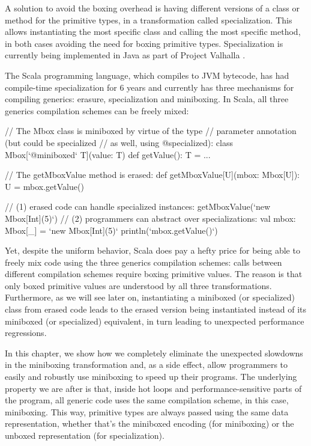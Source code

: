 A solution to avoid the boxing overhead is having different versions of a class or method for the primitive types, in a transformation called specialization. This allows instantiating the most specific class and calling the most specific method, in both cases avoiding the need for boxing primitive types. Specialization is currently being implemented in Java as part of Project Valhalla \cite{goetz-specialization, rose-value-classes-tearing, rose-value-classes-vm}.

The Scala programming language, which compiles to JVM bytecode, has had compile-time specialization for 6 years \cite{iuli-thesis, specialization-iuli} and currently has three mechanisms for compiling generics: erasure, specialization and miniboxing. In Scala, all three generics compilation schemes can be freely mixed:

\begin{lstlisting-nobreak}
// The Mbox class is miniboxed by virtue of the type
// parameter annotation (but could be specialized
// as well, using @specialized):
class Mbox[`@miniboxed` T](value: T) {
  def getValue(): T = ...
}

// The getMboxValue method is erased:
def getMboxValue[U](mbox: Mbox[U]): U = mbox.getValue()

// (1) erased code can handle specialized instances:
getMboxValue(`new Mbox[Int](5)`)
// (2) programmers can abstract over specializations:
val mbox: Mbox[_] = `new Mbox[Int](5)`
println(`mbox.getValue()`)
\end{lstlisting-nobreak}

Yet, despite the uniform behavior, Scala does pay a hefty price for being able to freely mix code using the three generics compilation schemes: calls between different compilation schemes require boxing primitive values. The reason is that only boxed primitive values are understood by all three transformations. Furthermore, as we will see later on, instantiating a miniboxed (or specialized) class from erased code leads to the erased version being instantiated instead of its miniboxed (or specialized) equivalent, in turn leading to unexpected performance regressions.

In this chapter, we show how we completely eliminate the unexpected slowdowns in the miniboxing transformation and, as a side effect, allow programmers to easily and robustly use miniboxing to speed up their programs. The underlying property we are after is that, inside hot loops and performance-sensitive parts of the program, all generic code uses the same compilation scheme, in this case, miniboxing. This way, primitive types are always passed using the same data representation, whether that's the miniboxed encoding (for miniboxing) or the unboxed representation (for specialization).

